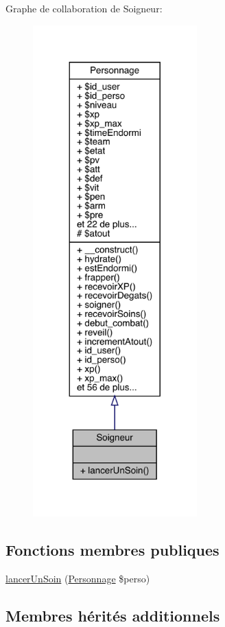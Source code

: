 Graphe de collaboration de Soigneur\+:\nopagebreak
\begin{figure}[H]
\begin{center}
\leavevmode
\includegraphics[width=179pt]{class_soigneur__coll__graph}
\end{center}
\end{figure}
\subsection*{Fonctions membres publiques}
\begin{DoxyCompactItemize}
\item 
\mbox{\hyperlink{class_soigneur_ac68dd65c897e55dc77d354e79e79a52c}{lancer\+Un\+Soin}} (\mbox{\hyperlink{class_personnage}{Personnage}} \$perso)
\end{DoxyCompactItemize}
\subsection*{Membres hérités additionnels}


